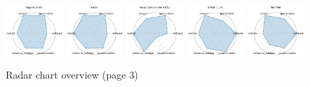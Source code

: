 \begin{figure}[ht!]
\\[1ex]
\includegraphics[width=0.1900\textwidth]{images/supercond_radar.pdf}
\includegraphics[width=0.1900\textwidth]{images/gess_radar.pdf}
\includegraphics[width=0.1900\textwidth]{images/vocal_call_locator_vcl_radar.pdf}
\includegraphics[width=0.1900\textwidth]{images/spiqa_llm_radar.pdf}
\includegraphics[width=0.1900\textwidth]{images/the_well_radar.pdf}
\\[1ex]
\caption{Radar chart overview (page 3)}
\end{figure}

